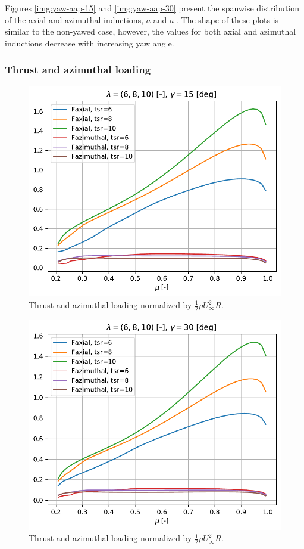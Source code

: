 Figures \ref{img:yaw-aap-15} and \ref{img:yaw-aap-30} present the spanwise distribution of the axial and azimuthal inductions, $a$ and $a^,$. The shape of these plots is similar to the non-yawed case, however, the values for both axial and azimuthal inductions decrease with increasing yaw angle.

\subsubsection{\textbf{Thrust and azimuthal loading}}

\begin{figure}[htbp]
	\centering
	\includegraphics[height=0.45\textheight]{./img/yaw/Fax_Faz-yaw_15.pdf}
	\caption{Thrust and azimuthal loading normalized by $\frac{1}{2} \rho U_\infty^2 R$.}
	\label{img:yaw-f-15}
\end{figure}
\begin{figure}[htbp]
	\centering
	\includegraphics[height=0.45\textheight]{./img/yaw/Fax_Faz-yaw_30.pdf}
	\caption{Thrust and azimuthal loading normalized by $\frac{1}{2} \rho U_\infty^2 R$.}
	\label{img:yaw-f-30}
\end{figure}

